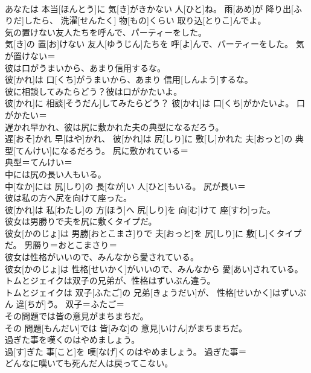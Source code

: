 \documentclass[8pt]{extreport}
\begin{document}
\begin{CJK}{UTF8}{min}
\\	あなたは 本当[ほんとう]に 気[き]がきかない 人[ひと]ね。 雨[あめ]が 降り出[ふりだ]したら、 洗濯[せんたく] 物[もの]くらい 取り込[とりこ]んでよ。	
\\	気の置けない友人たちを呼んで、パーティーをした。	
\\	気[き]の 置[お]けない 友人[ゆうじん]たちを 呼[よ]んで、パーティーをした。	気が置けない＝ 
\\	彼は口がうまいから、あまり信用するな。	
\\	彼[かれ]は 口[くち]がうまいから、あまり 信用[しんよう]するな。	
\\	彼に相談してみたらどう？彼は口がかたいよ。	
\\	彼[かれ]に 相談[そうだん]してみたらどう？ 彼[かれ]は 口[くち]がかたいよ。	口がかたい＝ 
\\	遅かれ早かれ、彼は尻に敷かれた夫の典型になるだろう。	
\\	遅[おそ]かれ 早[はや]かれ、 彼[かれ]は 尻[しり]に 敷[し]かれた 夫[おっと]の 典型[てんけい]になるだろう。	尻に敷かれている＝ 
\\	典型＝てんけい＝ 
\\	中には尻の長い人もいる。	
\\	中[なか]には 尻[しり]の 長[なが]い 人[ひと]もいる。	尻が長い＝ 
\\	彼は私の方へ尻を向けて座った。	
\\	彼[かれ]は 私[わたし]の 方[ほう]へ 尻[しり]を 向[む]けて 座[すわ]った。	
\\	彼女は男勝りで夫を尻に敷くタイプだ。	
\\	彼女[かのじょ]は 男勝[おとこまさ]りで 夫[おっと]を 尻[しり]に 敷[し]くタイプだ。	男勝り＝おとこまさり＝ 
\\	彼女は性格がいいので、みんなから愛されている。	
\\	彼女[かのじょ]は 性格[せいかく]がいいので、みんなから 愛[あい]されている。	
\\	トムとジェイクは双子の兄弟が、性格はずいぶん違う。	
\\	トムとジェイクは 双子[ふたご]の 兄弟[きょうだい]が、 性格[せいかく]はずいぶん 違[ちが]う。	双子＝ふたご＝ 
\\	その問題では皆の意見がまちまちだ。	
\\	その 問題[もんだい]では 皆[みな]の 意見[いけん]がまちまちだ。	
\\	過ぎた事を嘆くのはやめましょう。	
\\	過[す]ぎた 事[こと]を 嘆[なげ]くのはやめましょう。	過ぎた事＝ 
\\	どんなに嘆いても死んだ人は戻ってこない。	

\end{CJK}
\end{document}
